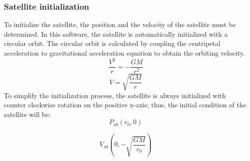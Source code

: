 \documentclass[12pt, letter]{article}
\begin{document}
\subsubsection {Satellite initialization}
To initialize the satellite, the position and the velocity of the satellite must be determined. In this software, the satellite is automatically initialized with a circular orbit. The circular orbit is calculated by coupling the centripetal acceleration to gravitational acceleration equation to obtain the orbiting velocity. 
\begin{equation} \label{Orbit velocity 1}
\frac{V^2}{r}=-\frac{GM}{r^2}
\end{equation}
\begin{equation} \label{Orbit velocity 2}
V=\sqrt{\frac{GM}{r}}
\end{equation}
To simplify the initialization process, the satellite is always initialized with counter clockwise rotation on the positive x-axis; thus, the initial condition of the satellite will be: 
\begin{equation} \label{Initial position}
P_{s0} (r_0,0) 
\end{equation}

\begin{equation} \label{Initial velocity}
V_{s0} (0,-\sqrt{\frac{GM}{r_0}})
\end{equation}
\end{document}
